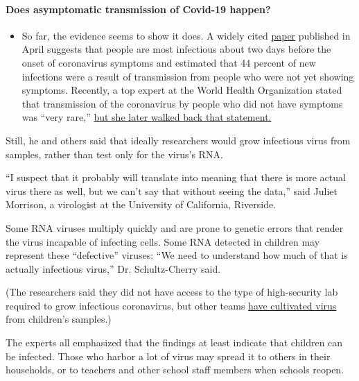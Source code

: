\begin{itemize}
{  \paragraph{Does asymptomatic transmission of Covid-19
  happen?}\label{does-asymptomatic-transmission-of-covid-19-happen}}

  \begin{itemize}
  \tightlist
  \item
    So far, the evidence seems to show it does. A widely cited
    \href{https://www.nature.com/articles/s41591-020-0869-5}{paper}
    published in April suggests that people are most infectious about
    two days before the onset of coronavirus symptoms and estimated that
    44 percent of new infections were a result of transmission from
    people who were not yet showing symptoms. Recently, a top expert at
    the World Health Organization stated that transmission of the
    coronavirus by people who did not have symptoms was ``very rare,''
    \href{https://www.nytimes.com/2020/06/09/world/coronavirus-updates.html?action=click\&pgtype=Article\&state=default\&region=MAIN_CONTENT_3\&context=storylines_faq\#link-1f302e21}{but
    she later walked back that statement.}
  \end{itemize}
\end{itemize}

Still, he and others said that ideally researchers would grow infectious
virus from samples, rather than test only for the virus's RNA.

``I suspect that it probably will translate into meaning that there is
more actual virus there as well, but we can't say that without seeing
the data,'' said Juliet Morrison, a virologist at the University of
California, Riverside.

Some RNA viruses multiply quickly and are prone to genetic errors that
render the virus incapable of infecting cells. Some RNA detected in
children may represent these ``defective'' viruses: ``We need to
understand how much of that is actually infectious virus,'' Dr.
Schultz-Cherry said.

(The researchers said they did not have access to the type of
high-security lab required to grow infectious coronavirus, but other
teams \href{https://pubmed.ncbi.nlm.nih.gov/32603290/}{have cultivated
virus} from children's samples.)

The experts all emphasized that the findings at least indicate that
children can be infected. Those who harbor a lot of virus may spread it
to others in their households, or to teachers and other school staff
members when schools reopen.

